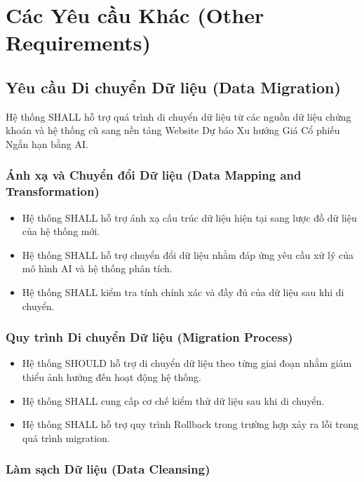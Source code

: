 \documentclass[12pt, a4paper]{article}
\begin{document}
\section{Các Yêu cầu Khác (Other Requirements)}

\subsection{Yêu cầu Di chuyển Dữ liệu (Data Migration)}

Hệ thống SHALL hỗ trợ quá trình di chuyển dữ liệu từ các nguồn dữ liệu chứng khoán và hệ thống cũ sang nền tảng Website Dự báo Xu hướng Giá Cổ phiếu Ngắn hạn bằng AI.

\subsubsection{Ánh xạ và Chuyển đổi Dữ liệu (Data Mapping and Transformation)}

\begin{itemize}
    \item Hệ thống SHALL hỗ trợ ánh xạ cấu trúc dữ liệu hiện tại sang lược đồ dữ liệu của hệ thống mới.

    \item Hệ thống SHALL hỗ trợ chuyển đổi dữ liệu nhằm đáp ứng yêu cầu xử lý của mô hình AI và hệ thống phân tích.

    \item Hệ thống SHALL kiểm tra tính chính xác và đầy đủ của dữ liệu sau khi di chuyển.
\end{itemize}

\subsubsection{Quy trình Di chuyển Dữ liệu (Migration Process)}

\begin{itemize}
    \item Hệ thống SHOULD hỗ trợ di chuyển dữ liệu theo từng giai đoạn nhằm giảm thiểu ảnh hưởng đến hoạt động hệ thống.

    \item Hệ thống SHALL cung cấp cơ chế kiểm thử dữ liệu sau khi di chuyển.

    \item Hệ thống SHALL hỗ trợ quy trình Rollback trong trường hợp xảy ra lỗi trong quá trình migration.
\end{itemize}

\subsubsection{Làm sạch Dữ liệu (Data Cleansing)}
\end{document}
